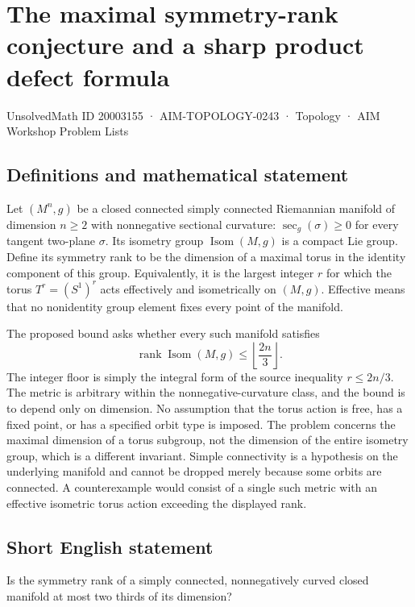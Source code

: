\documentclass[11pt,a4paper]{article}
\begin{document}
\section*{The maximal symmetry-rank conjecture and a sharp product defect formula}\label{20003155}
{\small UnsolvedMath ID 20003155 · AIM-TOPOLOGY-0243 · Topology · AIM Workshop Problem Lists}
\subsection{Definitions and mathematical statement}
Let $(M^n,g)$ be a closed connected simply connected Riemannian manifold of dimension $n\geq2$ with nonnegative sectional curvature:
$\sec_g(\sigma)\geq0$ for every tangent two-plane $\sigma$.
Its isometry group $\operatorname{Isom}(M,g)$ is a compact Lie group.
Define its symmetry rank to be the dimension of a maximal torus in the identity component of this group.
Equivalently, it is the largest integer $r$ for which the torus $T^r=(S^1)^r$ acts effectively and isometrically on $(M,g)$.
Effective means that no nonidentity group element fixes every point of the manifold.

The proposed bound asks whether every such manifold satisfies
\[
 \operatorname{rank}\operatorname{Isom}(M,g)
          \leq\left\lfloor\frac{2n}{3}\right\rfloor.
\]
The integer floor is simply the integral form of the source inequality $r\leq2n/3$.
The metric is arbitrary within the nonnegative-curvature class, and the bound is to depend only on dimension.
No assumption that the torus action is free, has a fixed point, or has a specified orbit type is imposed.
The problem concerns the maximal dimension of a torus subgroup, not the dimension of the entire isometry group, which is a different invariant.
Simple connectivity is a hypothesis on the underlying manifold and cannot be dropped merely because some orbits are connected.
A counterexample would consist of a single such metric with an effective isometric torus action exceeding the displayed rank.
\subsection{Short English statement}
Is the symmetry rank of a simply connected, nonnegatively curved closed manifold at most two thirds of its dimension?
\end{document}
